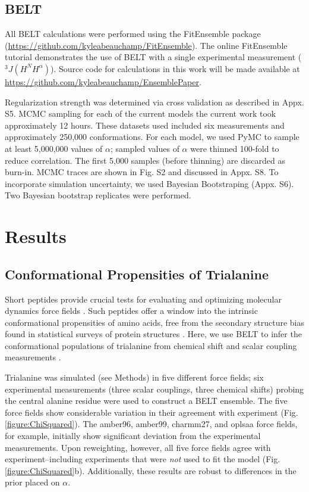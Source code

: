 \documentclass[11pt,titlepage]{article}
\begin{document}
\subsection*{BELT}

All BELT calculations were performed using the FitEnsemble package (\url{https://github.com/kyleabeauchamp/FitEnsemble}).  The online FitEnsemble tutorial demonstrates the use of BELT with a single experimental measurement ($^3J(H^N H^\alpha)$).  Source code for calculations in this work will be made available at \url{https://github.com/kyleabeauchamp/EnsemblePaper}.  

Regularization strength was determined via cross validation as described in Appx. S5.  MCMC sampling for each of the current models the current work took approximately 12 hours.  These datasets used included six measurements and approximately 250,000 conformations.  For each model, we used PyMC to sample at least 5,000,000 values of $\alpha$; sampled values of $\alpha$ were thinned 100-fold to reduce correlation.  The first 5,000 samples (before thinning) are discarded as burn-in.  MCMC traces are shown in Fig. S2 and discussed in Appx. S8.  To incorporate simulation uncertainty, we used Bayesian Bootstraping (Appx. S6).  Two Bayesian bootstrap replicates were performed.  

\section*{Results}

\subsection*{Conformational Propensities of Trialanine}

Short peptides provide crucial tests for evaluating and optimizing molecular dynamics force fields \citep{Graf2007,beauchamp2012protein, Nerenberg2011, Best2008, Grdadolnik2011}.  Such peptides offer a window into the intrinsic conformational propensities of amino acids, free from the secondary structure bias found in statistical surveys of protein structures \citep{Jha2005}.  Here, we use BELT to infer the conformational populations of trialanine from chemical shift and scalar coupling measurements \citep{Graf2007}.  

Trialanine was simulated (see Methods) in five different force fields; six experimental measurements (three scalar couplings, three chemical shifts) probing the central alanine residue were used to construct a BELT ensemble.  The five force fields show considerable variation in their agreement with experiment (Fig. \ref{figure:ChiSquared}).  The amber96, amber99, charmm27, and oplsaa force fields, for example, initially show significant deviation from the experimental measurements.  Upon reweighting, however, all five force fields agree with experiment--including experiments that were \emph{not} used to fit the model (Fig. \ref{figure:ChiSquared}b).  Additionally, these results are robust to differences in the prior placed on $\alpha$.
\end{document}

